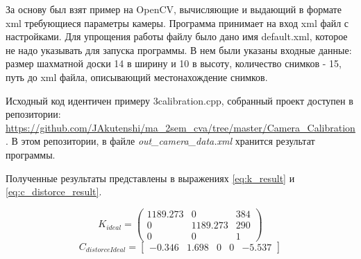 За основу был взят пример на OpenCV, вычисляющие и выдающий в формате xml требующиеся параметры камеры. Программа принимает на вход xml файл с настройками. Для упрощения работы файлу было дано имя default.xml, которое не надо указывать для запуска программы. В нем были указаны входные данные: размер шахматной доски 14 в ширину и 10 в высоту, количество снимков - 15, путь до xml файла, описывающий местонахождение снимков.

Исходный код идентичен примеру 3calibration.cpp, собранный проект доступен в репозитории: \url{https://github.com/JAkutenshi/ma_2sem_cva/tree/master/Camera_Calibration}. В этом репозитории, в файле \textit{out\_camera\_data.xml } хранится результат программы.

Полученные результаты представлены в выражениях \eqref{eq:k_result} и \eqref{eq:c_distorce_result}.

\begin{equation}\label{eq:k_result}
K_{ideal} = 
\begin{pmatrix}
1189.273 & 0 		& 384 \\
0		 & 1189.273 & 290 \\ 
0		 & 0		& 1 
\end{pmatrix}
\end{equation}
\begin{equation}\label{eq:c_distorce_result}
C_{distorceIdeal} = 
\left[
\begin{array}{ccccc}
-0.346 & 1.698 & 0 & 0 & -5.537
\end{array}
\right]
\end{equation}